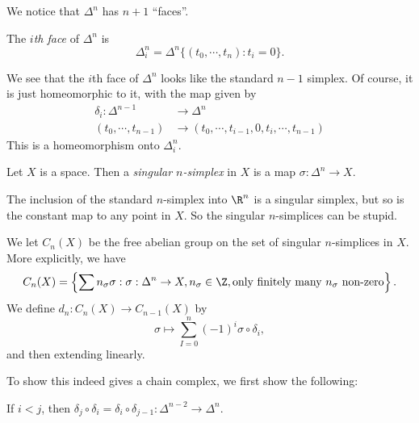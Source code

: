 \documentclass[a4paper]{article}
\begin{document}
We notice that $\Delta^n$ has $n + 1$ ``faces''.
\begin{defi}
  The \emph{$i$th face} of $\Delta^n$ is
  \[
    \Delta_i^n = \Delta^n \{(t_0, \cdots, t_n): t_i = 0\}.
  \]
\end{defi}

\begin{center}
\end{center}

We see that the $i$th face of $\Delta^n$ looks like the standard $n-1$ simplex. Of course, it is just homeomorphic to it, with the map given by
\begin{align*}
  \delta_i: \Delta^{n - 1} &\to \Delta^n\\
  (t_0, \cdots, t_{n - 1}) &\to (t_0, \cdots, t_{i - 1}, 0, t_i, \cdots, t_{n - 1})
\end{align*}
This is a homeomorphism onto $\Delta_i^n$.

\begin{defi}
  Let $X$ is a space. Then a \emph{singular $n$-simplex} in $X$ is a map $\sigma: \Delta^n \to X$.
\end{defi}

\begin{eg}
  The inclusion of the standard $n$-simplex into $\R^n$ is a singular simplex, but so is the constant map to any point in $X$. So the singular $n$-simplices can be stupid.
\end{eg}

We let $C_n(X)$ be the free abelian group on the set of singular $n$-simplices in $X$. More explicitly, we have
\[
  C_n(X) = \left\{\sum n_\sigma \sigma: \sigma: \Delta^n \to X, n_\sigma \in \Z, \text{only finitely many $n_\sigma$ non-zero}\right\}.
\]
We define $d_n: C_n(X) \to C_{n - 1}(X)$ by
\[
  \sigma \mapsto \sum_{I = 0}^n (-1)^i \sigma \circ \delta_i,
\]
and then extending linearly.

To show this indeed gives a chain complex, we first show the following:
\begin{lemma}
  If $i < j$, then $\delta_j \circ \delta_i = \delta_i \circ \delta_{j - 1} : \Delta^{n - 2} \to \Delta^n$.
\end{lemma}
\end{document}
